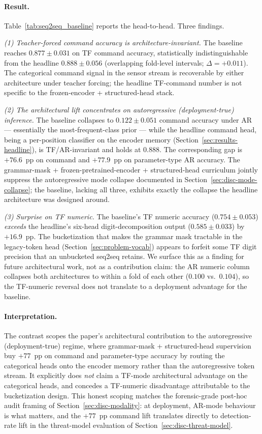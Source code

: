 \documentclass[sensors,article,submit,moreauthors,pdftex]{Definitions/mdpi}
\begin{document}
\paragraph{Result.} Table~\ref{tab:seq2seq_baseline} reports the head-to-head. Three findings.

\emph{(1) Teacher-forced command accuracy is architecture-invariant.} The baseline reaches $0.877 \pm 0.031$ on TF command accuracy, statistically indistinguishable from the headline $0.888 \pm 0.056$ (overlapping fold-level intervals; $\Delta = +0.011$). The categorical command signal in the sensor stream is recoverable by either architecture under teacher forcing; the headline TF-command number is not specific to the frozen-encoder + structured-head stack.

\emph{(2) The architectural lift concentrates on autoregressive (deployment-true) inference.} The baseline collapses to $0.122 \pm 0.051$ command accuracy under AR --- essentially the most-frequent-class prior --- while the headline command head, being a per-position classifier on the encoder memory (Section~\ref{sec:results-headline}), is TF/AR-invariant and holds at $0.888$. The corresponding gap is $+76.6$~pp on command and $+77.9$~pp on parameter-type AR accuracy. The grammar-mask + frozen-pretrained-encoder + structured-head curriculum jointly suppress the autoregressive mode collapse documented in Section~\ref{sec:disc-mode-collapse}; the baseline, lacking all three, exhibits exactly the collapse the headline architecture was designed around.

\emph{(3) Surprise on TF numeric.} The baseline's TF numeric accuracy ($0.754 \pm 0.053$) \emph{exceeds} the headline's six-head digit-decomposition output ($0.585 \pm 0.033$) by $+16.9$~pp. The bucketization that makes the grammar mask tractable in the legacy-token head (Section~\ref{sec:problem-vocab}) appears to forfeit some TF digit precision that an unbucketed seq2seq retains. We surface this as a finding for future architectural work, not as a contribution claim: the AR numeric column collapses both architectures to within a fold of each other ($0.100$ vs.\ $0.104$), so the TF-numeric reversal does not translate to a deployment advantage for the baseline.

\paragraph{Interpretation.} The contrast scopes the paper's architectural contribution to the autoregressive (deployment-true) regime, where grammar-mask + structured-head supervision buy $+77$~pp on command and parameter-type accuracy by routing the categorical heads onto the encoder memory rather than the autoregressive token stream. It explicitly does \emph{not} claim a TF-mode architectural advantage on the categorical heads, and concedes a TF-numeric disadvantage attributable to the bucketization design. This honest scoping matches the forensic-grade post-hoc audit framing of Section~\ref{sec:disc-modality}: at deployment, AR-mode behaviour is what matters, and the $+77$~pp command lift translates directly to detection-rate lift in the threat-model evaluation of Section~\ref{sec:disc-threat-model}.
\end{document}
